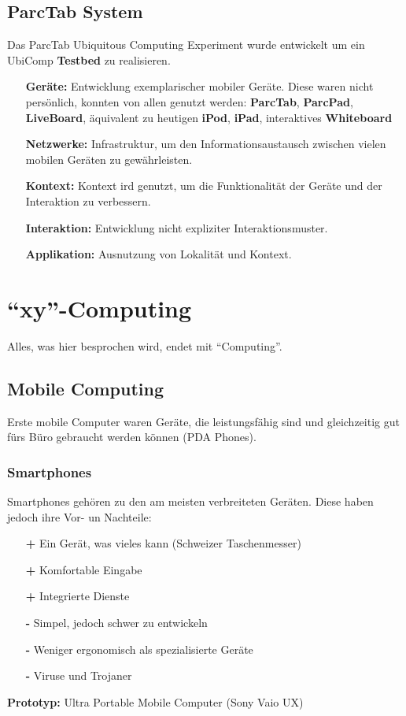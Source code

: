 \documentclass[a4paper]{article}
\begin{document}
\subsection{ParcTab System}
Das ParcTab Ubiquitous Computing Experiment wurde entwickelt um ein UbiComp \textbf{Testbed} zu realisieren. 
\begin{itemize}
	\item[\textbf{Geräte:}] Entwicklung exemplarischer mobiler Geräte. Diese waren nicht persönlich, konnten von allen genutzt werden: \textbf{ParcTab}, \textbf{ParcPad}, \textbf{LiveBoard}, äquivalent zu heutigen \textbf{iPod}, \textbf{iPad}, interaktives \textbf{Whiteboard}
	\item[\textbf{Netzwerke:}] Infrastruktur, um den Informationsaustausch zwischen vielen mobilen Geräten zu gewährleisten.
	\item[\textbf{Kontext:}] Kontext ird genutzt, um die Funktionalität der Geräte und der Interaktion zu verbessern.
	\item[\textbf{Interaktion:}] Entwicklung nicht expliziter Interaktionsmuster.
	\item[\textbf{Applikation:}] Ausnutzung von Lokalität und Kontext.
\end{itemize}

\newpage
\section{``xy''-Computing}
Alles, was hier besprochen wird, endet mit ``Computing''.

\subsection{Mobile Computing}
Erste mobile Computer waren Geräte, die leistungsfähig sind und gleichzeitig gut fürs Büro gebraucht werden können (PDA Phones).
\subsubsection{Smartphones}
Smartphones gehören zu den am meisten verbreiteten Geräten. Diese haben jedoch ihre Vor- un Nachteile:
\begin{itemize}
	\item[\textbf{+}] Ein Gerät, was vieles kann (Schweizer Taschenmesser)
	\item[\textbf{+}] Komfortable Eingabe
	\item[\textbf{+}] Integrierte Dienste
	\item[\textbf{-}] Simpel, jedoch schwer zu entwickeln
	\item[\textbf{-}] Weniger ergonomisch als spezialisierte Geräte
	\item[\textbf{-}] Viruse und Trojaner
\end{itemize}  
\textbf{Prototyp:} Ultra Portable Mobile Computer (Sony Vaio UX)
\end{document}
